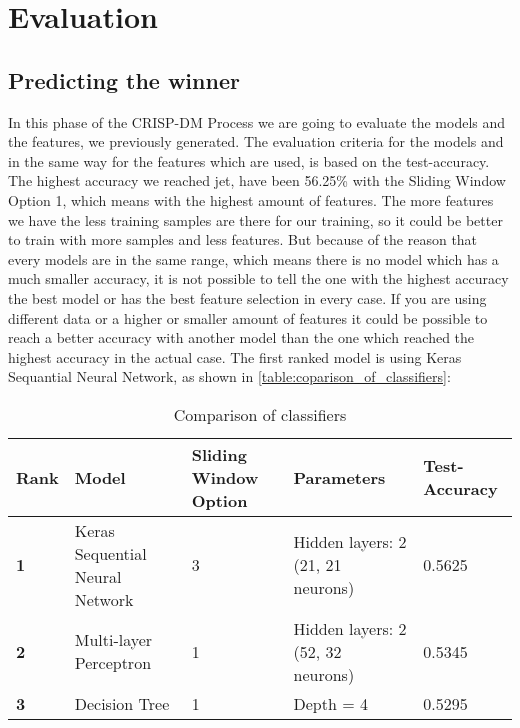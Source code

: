 
\chapter{Evaluation}
\section{Predicting the winner}
In this phase of the CRISP-DM Process we are going to evaluate the models and the features, we previously generated.\newline
The evaluation criteria for the models and in the same way for the features which are used, is based on the test-accuracy. The highest accuracy we reached jet, have been 56.25\% with the Sliding Window Option 1, which means with the highest amount of features. The more features we have the less training samples are there for our training, so it could be better to train with more samples and less features. But because of the reason that every models are in the same range, which means there is no model which has a much smaller accuracy, it is not possible to tell the one with the highest accuracy the best model or has the best feature selection in every case. If you are using different data or a higher or smaller amount of features it could be possible to reach a better accuracy with another model than the one which reached the highest accuracy in the actual case. The first ranked model is using Keras Sequantial Neural Network, as shown in \autoref{table:coparison_of_classifiers}:

\begin{table}[H]
\centering
\begin{tabular}{|p{2.5cm}|p{2.5cm}|p{2.5cm}|p{2.5cm}|p{2.5cm}|}
\hline

\textbf{Rank} & \textbf{Model} & \textbf{Sliding Window Option} & \textbf{Parameters} & \textbf{Test-Accuracy} \\ \hline
\textbf{1} & Keras Sequential Neural Network & 3 & Hidden layers: 2 (21, 21 neurons) & 0.5625 \\ \hline
\textbf{2} & Multi-layer Perceptron & 1 & Hidden layers: 2 (52, 32 neurons) & 0.5345 \\ \hline
\textbf{3} & Decision Tree & 1 & Depth = 4 & 0.5295 \\ \hline

\end{tabular}
\caption{Comparison of classifiers}
\label{table:coparison_of_classifiers}
\end{table}

